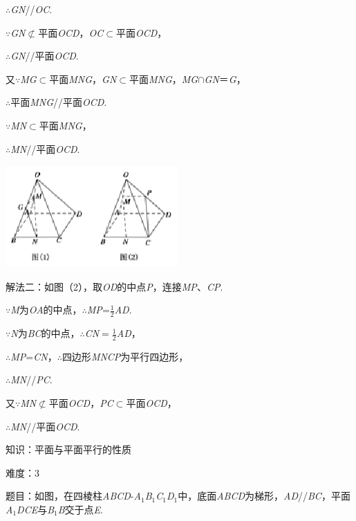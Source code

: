 \documentclass{article} %
\begin{document}
$\mathrm{\therefore}$\textit{GN}//\textit{OC}.

$\mathrm{\because}$\textit{GN}$\mathrm{\nsubset}$平面\textit{OCD}，\textit{OC}$\mathrm{\subset }$平面\textit{OCD}，

$\mathrm{\therefore}$\textit{GN}//平面\textit{OCD}.

又$\mathrm{\because}$\textit{MG}$\mathrm{\subset }$平面\textit{MNG}，\textit{GN}$\mathrm{\subset }$平面\textit{MNG}，\textit{MG}$\mathrm{\cap}$\textit{GN}＝\textit{G}，

$\mathrm{\therefore}$平面\textit{MNG}//平面\textit{OCD}.

$\mathrm{\because}$\textit{MN}$\mathrm{\subset }$平面\textit{MNG}，

$\mathrm{\therefore}$\textit{MN}//平面\textit{OCD}.

\includegraphics*[width=2.58in, height=1.53in, keepaspectratio=false]{image191}

解法二：如图（2），取\textit{OD}的中点\textit{P}，连接\textit{MP}、\textit{CP}.

$\mathrm{\because}$\textit{M}为\textit{OA}的中点，$\mathrm{\therefore}$\textit{MP}=$\frac{1}{2}$\textit{AD}.

$\mathrm{\because}$\textit{N}为\textit{BC}的中点，$\mathrm{\therefore}$\textit{CN}$=\frac{1}{2}$\textit{AD}，

$\mathrm{\therefore}$\textit{MP}=\textit{CN}，$\mathrm{\therefore}$四边形\textit{MNCP}为平行四边形，

$\mathrm{\therefore}$\textit{MN}//\textit{PC}.

又$\mathrm{\because}$\textit{MN}$\mathrm{\nsubset}$平面\textit{OCD}，\textit{PC}$\mathrm{\subset }$平面\textit{OCD}，

$\mathrm{\therefore}$\textit{MN}//平面\textit{OCD}.

知识：平面与平面平行的性质

难度：3

题目：如图，在四棱柱\textit{ABCD}-\textit{A}${}_{1}$\textit{B}${}_{1}$\textit{C}${}_{1}$\textit{D}${}_{1}$中，底面\textit{ABCD}为梯形，\textit{AD}//\textit{BC}，平面\textit{A}${}_{1}$\textit{DCE}与\textit{B}${}_{1}$\textit{B}交于点\textit{E}.
\end{document}
